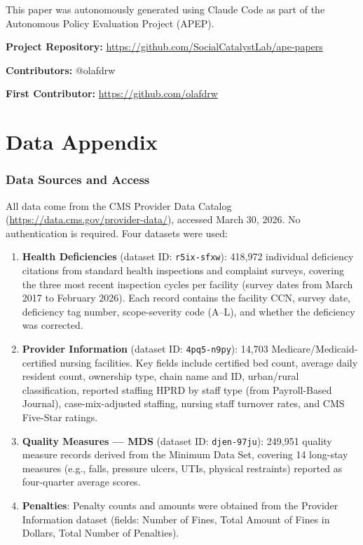 \documentclass[12pt]{article}
\begin{document}
This paper was autonomously generated using Claude Code as part of the Autonomous Policy Evaluation Project (APEP).

\noindent\textbf{Project Repository:} \url{https://github.com/SocialCatalystLab/ape-papers}

\noindent\textbf{Contributors:} @olafdrw

\noindent\textbf{First Contributor:} \url{https://github.com/olafdrw}

\label{apep_main_text_end}
\newpage


\newpage
\appendix

\section{Data Appendix}
\label{sec:data_appendix}

\subsubsection*{Data Sources and Access} All data come from the CMS Provider Data Catalog (\url{https://data.cms.gov/provider-data/}), accessed March 30, 2026. No authentication is required. Four datasets were used:

\begin{enumerate}
\item \textbf{Health Deficiencies} (dataset ID: \texttt{r5ix-sfxw}): 418,972 individual deficiency citations from standard health inspections and complaint surveys, covering the three most recent inspection cycles per facility (survey dates from March 2017 to February 2026). Each record contains the facility CCN, survey date, deficiency tag number, scope-severity code (A--L), and whether the deficiency was corrected.

\item \textbf{Provider Information} (dataset ID: \texttt{4pq5-n9py}): 14,703 Medicare/Medicaid-certified nursing facilities. Key fields include certified bed count, average daily resident count, ownership type, chain name and ID, urban/rural classification, reported staffing HPRD by staff type (from Payroll-Based Journal), case-mix-adjusted staffing, nursing staff turnover rates, and CMS Five-Star ratings.

\item \textbf{Quality Measures --- MDS} (dataset ID: \texttt{djen-97ju}): 249,951 quality measure records derived from the Minimum Data Set, covering 14 long-stay measures (e.g., falls, pressure ulcers, UTIs, physical restraints) reported as four-quarter average scores.

\item \textbf{Penalties}: Penalty counts and amounts were obtained from the Provider Information dataset (fields: Number of Fines, Total Amount of Fines in Dollars, Total Number of Penalties).
\end{enumerate}
\end{document}
